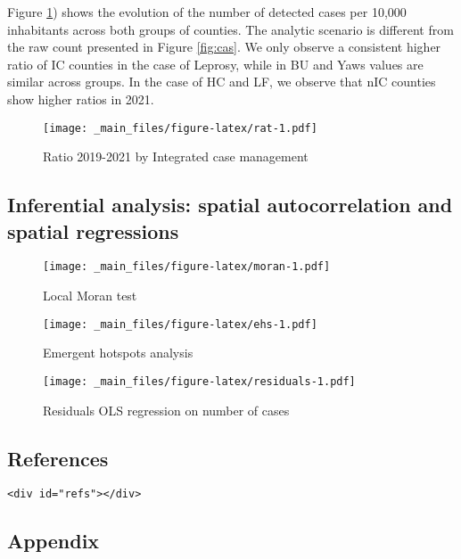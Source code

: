 \documentclass[
]{article}
\begin{document}
Figure \ref{fig:rat}) shows the evolution of the number of detected cases per 10,000 inhabitants across both groups of counties. The analytic scenario is different from the raw count presented in Figure \ref{fig:cas}. We only observe a consistent higher ratio of IC counties in the case of Leprosy, while in BU and Yaws values are similar across groups. In the case of HC and LF, we observe that nIC counties show higher ratios in 2021.

\begin{figure}
\centering
\texttt{[image: \_main\_files/figure-latex/rat-1.pdf]}
\caption{\label{fig:rat}Ratio 2019-2021 by Integrated case management}
\end{figure}

\hypertarget{inferential-analysis-spatial-autocorrelation-and-spatial-regressions}{%
\subsection{Inferential analysis: spatial autocorrelation and spatial regressions}\label{inferential-analysis-spatial-autocorrelation-and-spatial-regressions}}

\begin{figure}
\centering
\texttt{[image: \_main\_files/figure-latex/moran-1.pdf]}
\caption{\label{fig:moran}Local Moran test}
\end{figure}

\begin{figure}
\centering
\texttt{[image: \_main\_files/figure-latex/ehs-1.pdf]}
\caption{\label{fig:ehs}Emergent hotspots analysis}
\end{figure}

\begin{figure}
\centering
\texttt{[image: \_main\_files/figure-latex/residuals-1.pdf]}
\caption{\label{fig:residuals}Residuals OLS regression on number of cases}
\end{figure}

\hypertarget{references}{%
\subsection{References}\label{references}}

\begin{verbatim}
<div id="refs"></div>
\end{verbatim}

\hypertarget{appendix}{%
\subsection{Appendix}\label{appendix}}
\end{document}
